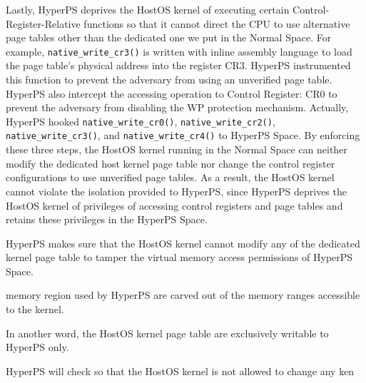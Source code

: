 Lastly, HyperPS deprives the HostOS kernel of executing certain Control-Register-Relative functions so that it cannot direct the CPU to use alternative page tables other than the dedicated one we put in the Normal Space. 
For example, \verb|native_write_cr3()| is written with inline assembly language to load the page table's physical address into the register CR3. 
HyperPS instrumented this function to prevent the adversary from using an unverified page table. 
HyperPS also intercept the accessing operation to Control Register: CR0 to prevent the adversary from disabling the WP protection mechanism.
Actually, HyperPS hooked \verb|native_write_cr0()|, \verb|native_write_cr2()|, \verb|native_write_cr3()|, and \verb|native_write_cr4()| to HyperPS Space.
By enforcing these three steps, the HostOS kernel running in the Normal Space can neither modify the dedicated host kernel page table nor change the control register configurations to use unverified page tables. 
As a result, the HostOS kernel cannot violate the isolation provided to HyperPS, since HyperPS deprives the HostOS kernel of privileges of accessing control registers and page tables and retains these privileges in the HyperPS Space.




\iffalse
HyperPS makes sure that the HostOS kernel cannot modify any of the dedicated kernel page table to tamper the virtual memory access permissions of HyperPS Space. 

memory region used by HyperPS are carved out of the memory ranges accessible to the kernel.

In another word, the HostOS kernel page table are exclusively writable to HyperPS only. 


HyperPS will check 
so that the HostOS kernel is not allowed to change any ken

